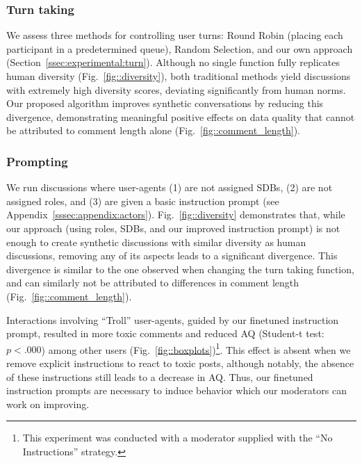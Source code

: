 \subsubsection{Turn taking}

We assess three methods for controlling user turns: Round Robin (placing each participant in a predetermined queue), Random Selection, and our own approach (Section~\ref{ssec:experimental:turn}). Although no single function fully replicates human diversity (Fig.~\ref{fig::diversity}), both traditional methods yield discussions with extremely high diversity scores, deviating significantly from human norms. Our proposed algorithm improves synthetic conversations by reducing this divergence, demonstrating meaningful positive effects on data quality that cannot be attributed to comment length alone (Fig.~\ref{fig::comment_length}).


\subsubsection{Prompting}

We run discussions where user-agents (1) are not assigned \acp{SDB}, (2) are not assigned roles, and (3) are given a basic instruction prompt (see Appendix~\ref{sssec:appendix:actors}). Fig.~\ref{fig::diversity} demonstrates that, while our approach (using roles, \acp{SDB}, and our improved instruction prompt) is not enough to create synthetic discussions with similar diversity as human discussions, removing any of its aspects leads to a significant divergence. This divergence is similar to the one observed when changing the turn taking function, and can similarly not be attributed to differences in comment length (Fig.~\ref{fig::comment_length}).

Interactions involving “Troll” user-agents, guided by our finetuned instruction prompt, resulted in more toxic comments and reduced \ac{AQ} (Student-t test: $p<.000$) among other users (Fig.~\ref{fig::boxplots})\footnote{This experiment was conducted with a moderator supplied with the “No Instructions” strategy.}. This effect is absent when we remove explicit instructions to react to toxic posts, although notably, the absence of these instructions still leads to a decrease in \ac{AQ}. Thus, our finetuned instruction prompts are necessary to induce behavior which our moderators can work on improving.

